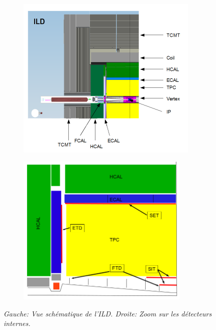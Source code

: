 \begin{figure}
	\centering
	\begin{subfigure}{0.5\textwidth}
		\includegraphics[width=0.95\textwidth]{graphics/ILD.png}
		
	\end{subfigure}%
	\begin{subfigure}{0.5\textwidth}
		\centering
		\includegraphics[width=0.9\textwidth]{graphics/ILDtracking.png}
		
	\end{subfigure}
	\caption{\sl Gauche: Vue sch\'ematique de l'ILD. Droite: Zoom sur les détecteurs internes.}
	\label{fig:ILDSchemeF}
\end{figure}
